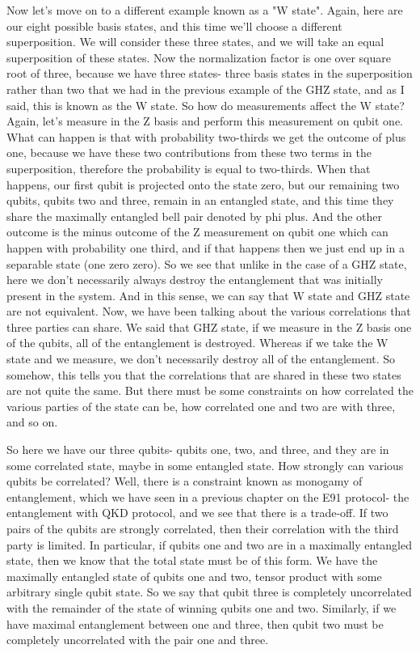 Now let's move on to a different example known as a "W state". Again, here are our eight possible basis states, and this time we'll choose a different superposition. We will consider these three states, and we will take an equal superposition of these states. Now the normalization factor is one over square root of three, because we have three states- three basis states in the superposition rather than two that we had in the previous example of the GHZ state, and as I said, this is known as the W state. So how do measurements affect the W state? Again, let's measure in the Z basis and perform this measurement on qubit one. What can happen is that with probability two-thirds we get the outcome of plus one, because we have these two contributions from these two terms in the superposition, therefore the probability is equal to two-thirds. When that happens, our first qubit is projected onto the state zero, but our remaining two qubits, qubits two and three, remain in an entangled state, and this time they share the maximally entangled bell pair denoted by phi plus. And the other outcome is the minus outcome of the Z measurement on qubit one which can happen with probability one third, and if that happens then we just end up in a separable state (one zero zero). So we see that unlike in the case of a GHZ state, here we don't necessarily always destroy the entanglement that was initially present in the system. And in this sense, we can say that W state and GHZ state are not equivalent. Now, we have been talking about the various correlations that three parties can share. We said that GHZ state, if we measure in the Z basis one of the qubits, all of the entanglement is destroyed. Whereas if we take the W state and we measure, we don't necessarily destroy all of the entanglement. So somehow, this tells you that the correlations that are shared in these two states are not quite the same. But there must be some constraints on how correlated the various parties of the state can be, how correlated one and two are with three, and so on.

So here we have our three qubits- qubits one, two, and three, and they are in some correlated state, maybe in some entangled state. How strongly can various qubits be correlated? Well, there is a constraint known as monogamy of entanglement, which we have seen in a previous chapter on the E91 protocol- the entanglement with QKD protocol, and we see that there is a trade-off. If two pairs of the qubits are strongly correlated, then their correlation with the third party is limited. In particular, if qubits one and two are in a maximally entangled state, then we know that the total state must be of this form. We have the maximally entangled state of qubits one and two, tensor product with some arbitrary single qubit state. So we say that qubit three is completely uncorrelated with the remainder of the state of winning qubits one and two. Similarly, if we have maximal entanglement between one and three, then qubit two must be completely uncorrelated with the pair one and three.

